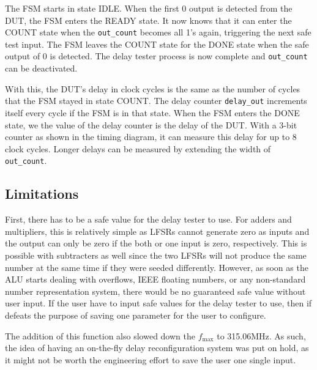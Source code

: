 The FSM starts in state IDLE.
When the first 0 output is detected from the DUT, the FSM enters the READY state.
It now knows that it can enter the COUNT state when the \texttt{out\_count} becomes all 1's again, triggering the next safe test input.
The FSM leaves the COUNT state for the DONE state when the safe output of 0 is detected.
The delay tester process is now complete and \texttt{out\_count} can be deactivated.

With this, the DUT's delay in clock cycles is the same as the number of cycles that the FSM stayed in state COUNT.
The delay counter \texttt{delay\_out} increments itself every cycle if the FSM is in that state.
When the FSM enters the DONE state, we the value of the delay counter is the delay of the DUT.
With a 3-bit counter as shown in the timing diagram, it can measure this delay for up to 8 clock cycles.
Longer delays can be measured by extending the width of \texttt{out\_count}.

\subsection{Limitations}
First, there has to be a safe value for the delay tester to use.
For adders and multipliers, this is relatively simple as LFSRs cannot generate zero as inputs and the output can only be zero if the both or one input is zero, respectively.
This is possible with subtracters as well since the two LFSRs will not produce the same number at the same time if they were seeded differently.
However, as soon as the ALU starts dealing with overflows, IEEE floating numbers, or any non-standard number representation system, there would be no guaranteed safe value without user input.
If the user have to input safe values for the delay tester to use, then if defeats the  purpose of saving one parameter for the user to configure.

The addition of this function also slowed down the $f_\text{max}$ to 315.06MHz.
As such, the idea of having an on-the-fly delay reconfiguration system was put on hold, as it might not be worth the engineering effort to save the user one single input.
